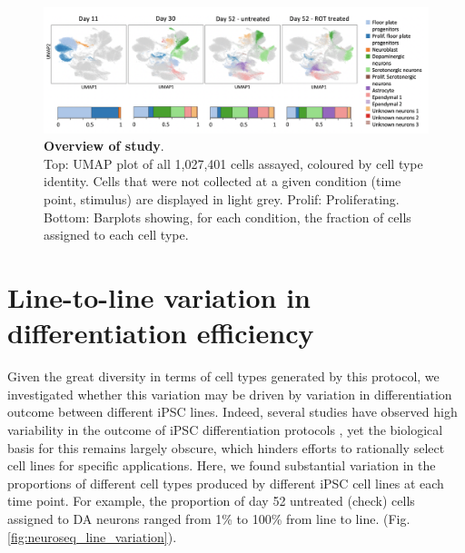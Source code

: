 \begin{figure}[h]
\centering
\includegraphics[width=17cm]{Chapter5/Fig/neuroseq_overview.png}
\caption[Overview of study]{\textbf{Overview of study}.\\
Top: UMAP plot of all 1,027,401 cells assayed, coloured by 
cell type identity. 
Cells that were not collected at a given condition (time point, stimulus) are displayed in light grey. 
Prolif: Proliferating. 
Bottom: Barplots showing, for each condition, the fraction of cells assigned to each cell type.}
\label{fig:neuroseq_overview}
\end{figure}


\newpage

\section{Line-to-line variation in differentiation efficiency}
\label{sec:neuroseq_diff_eff}

Given the great diversity in terms of cell types generated by this protocol, we investigated whether this variation may be driven by variation in differentiation outcome between different iPSC lines. 
Indeed, several studies have observed high variability in the outcome of iPSC differentiation protocols \cite{d2019association, volpato2018reproducibility}, yet the biological basis for this remains largely obscure, which hinders efforts to rationally select cell lines for specific applications. 
Here, we found substantial variation in the proportions of different cell types produced by different iPSC cell lines at each time point. 
For example, the proportion of day 52 untreated (check) cells assigned to DA neurons ranged from 1\% to 100\% from line to line.
(Fig. \ref{fig:neuroseq_line_variation}).

